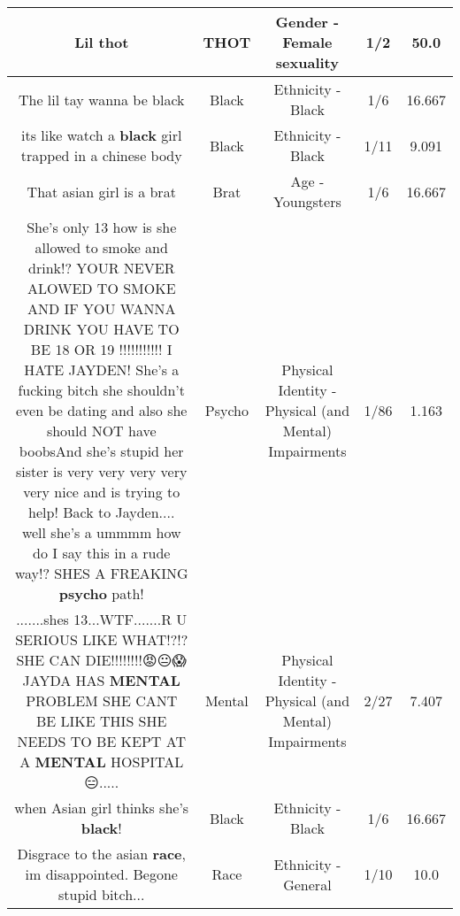\documentclass[11pt]{article}
\newlength\mylength
\begin{document}
\begin{center}
\begin{longtable}{|C{.65\mylength}|C{.30\mylength}|C{.12\mylength}|C{.12\mylength}|C{.12\mylength}|}
  \small Lil thot\normalsize   & THOT & Gender - Female sexuality & 1/2 & 50.0 \\  \hline
  \small The lil tay wanna be black\normalsize   & Black & Ethnicity - Black & 1/6 & 16.667 \\  \hline
  \small its like watch a \textbf{black} girl trapped in a chinese body\normalsize   & Black & Ethnicity - Black & 1/11 & 9.091 \\  \hline
  \small That asian girl is a brat\normalsize   & Brat & Age - Youngsters & 1/6 & 16.667 \\  \hline
  \small She's only 13 how is she allowed to smoke and drink!? YOUR NEVER ALOWED TO SMOKE AND IF YOU WANNA DRINK YOU HAVE TO BE 18 OR 19 !!!!!!!!!!! I HATE JAYDEN! She's a fucking bitch she shouldn't even be dating and also she should NOT have boobsAnd she's stupid her sister is very very very very very nice and is trying to help! Back to Jayden.... well she's a ummmm how do I say this in a rude way!? SHES A FREAKING \textbf{psycho} path!\normalsize   & Psycho & Physical Identity - Physical (and Mental) Impairments & 1/86 & 1.163 \\  \hline
  \small .......shes 13...WTF.......R U SERIOUS LIKE WHAT!?!? SHE CAN DIE!!!!!!!!😡😐😱 JAYDA HAS \textbf{MENTAL} PROBLEM SHE CANT BE LIKE THIS SHE NEEDS TO BE KEPT AT A \textbf{MENTAL} HOSPITAL😑.....\normalsize   & Mental & Physical Identity - Physical (and Mental) Impairments & 2/27 & 7.407 \\  \hline
  \small when Asian girl thinks she's \textbf{black}!\normalsize   & Black & Ethnicity - Black & 1/6 & 16.667 \\  \hline
  \small Disgrace to the asian \textbf{race}, im disappointed. Begone stupid bitch...\normalsize   & Race & Ethnicity - General & 1/10 & 10.0 \\  \hline

\end{longtable}
\end{center}
\end{document}
